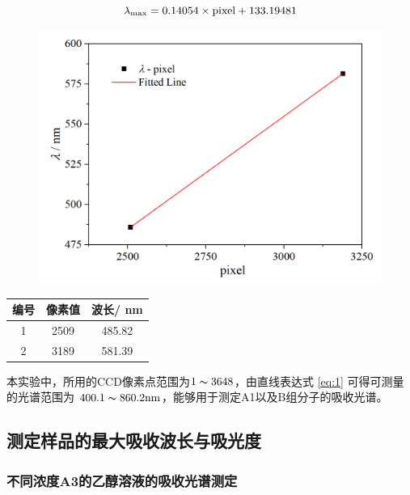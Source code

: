 \begin{equation}\label{eq:2}
    \lambda_{\rm max} = 0.14054 \times \mathrm{pixel}+ 133.19481
\end{equation}

\begin{figure}[H]
    \centering
    \includegraphics[width=.6\textwidth]{figures2/1-4.png}
    \label{fig:4}
\end{figure}

\begin{table}[H]
    \centering
    \begin{tabular}{ccc}
    \toprule
    编号 & 像素值 & 波长/ \si{nm}\\
    \midrule
    1 & 2509 & 485.82 \\
    2 & 3189 & 581.39 \\
    \bottomrule
    \end{tabular}
    \label{tab:2}
\end{table}

本实验中，所用的CCD像素点范围为$1\thicksim 3648$，由直线表达式 \eqref{eq:1} 可得可测量的光谱范围为 $400.1\thicksim 860.2 \si{nm}$，能够用于测定A1以及B组分子的吸收光谱。

\subsection{测定样品的最大吸收波长与吸光度}

\subsubsection{不同浓度A3的乙醇溶液的吸收光谱测定}

